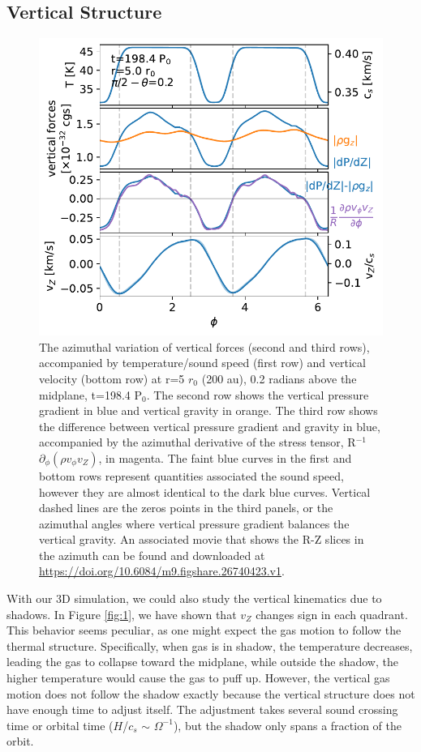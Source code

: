 \documentclass[twocolumn,tighten]{aastex631}
\begin{document}
\subsection{Vertical Structure \label{sec:vertical}}
\begin{figure}
\includegraphics[width=\linewidth]{Figure3.pdf}
    \caption{The azimuthal variation of vertical forces (second and third rows), accompanied by temperature/sound speed (first row) and vertical velocity (bottom row) at r=5 $r_0$ (200 au), 0.2 radians above the midplane, t=198.4 P$_0$. The second row shows the vertical pressure gradient in blue and vertical gravity in orange. The third row shows the difference between vertical pressure gradient and gravity in blue, accompanied by the azimuthal derivative of the stress tensor, R$^{-1}$$\partial_\phi(\rho v_\phi v_Z)$, in magenta. The faint blue curves in the first and bottom rows represent quantities associated the sound speed, however they are almost identical to the dark blue curves. Vertical dashed lines are the zeros points in the third panels, or the azimuthal angles where vertical pressure gradient balances the vertical gravity. An associated movie that shows the R-Z slices in the azimuth can be found and downloaded at \url{https://doi.org/10.6084/m9.figshare.26740423.v1}.}
    \label{fig:3}
\end{figure}

With our 3D simulation, we could also study the vertical kinematics due to shadows. In Figure \ref{fig:1}, we have shown that $v_Z$ changes sign in each quadrant. This behavior seems peculiar, as one might expect the gas motion to follow the thermal structure. Specifically, when gas is in shadow, the temperature decreases, leading the gas to collapse toward the midplane, while outside the shadow, the higher temperature would cause the gas to puff up. However, the vertical gas motion does not follow the shadow exactly because the vertical structure does not have enough time to adjust itself. The adjustment takes several sound crossing time or orbital time ($H$/$c_s$ $\sim$ $\Omega^{-1}$), but the shadow only spans a fraction of the orbit.
\end{document}
